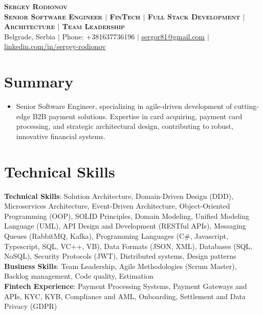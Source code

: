 \documentclass[letterpaper,11pt]{article}
\begin{document}
\begin{center}
    \textbf{\Huge \scshape Sergey Rodionov} \\
    \vspace{10pt} %
    \textbf{\LARGE \scshape Senior Software Engineer $|$ FinTech $|$ Full Stack Development $|$ Architecture $|$ Team Leadership } \\
    \vspace{10pt} %
    \small Belgrade, Serbia $|$ Phone: +381637736196 $|$ \href{mailto:sergor81@gmail.com}{\underline{sergor81@gmail.com}} $|$
    \href{https://www.linkedin.com/in/sergey-rodionov}{\underline{linkedin.com/in/sergey-rodionov}} \\
\end{center}

\section{Summary}
\begin{itemize}[leftmargin=0pt, label={}]
    \item \justifying Senior Software Engineer, specializing in agile-driven development of cutting-edge B2B payment solutions. Expertise in card acquiring, payment card processing, and strategic architectural design, contributing to robust, innovative financial systems.
\end{itemize}

\section{Technical Skills}
 \begin{itemize}[leftmargin=0pt, label={}]
    \small{
    \justifying %
        \item{
            \textbf{Technical Skills}{: Solution Architecture, Domain-Driven Design (DDD), Microservices Architecture, Event-Driven Architecture, Object-Oriented Programming (OOP), SOLID Principles, Domain Modeling, Unified Modeling Language (UML), API Design and Development (RESTful APIs), Messaging Queues (RabbitMQ, Kafka), Programming Languages (C\#, Javascript, Typescript, SQL, VC++, VB), Data Formats (JSON, XML), Databases (SQL, NoSQL), Security Protocols (JWT)}, Distributed systems, Design patterns \\
            \textbf{Business Skills}{: Team Leadership, Agile Methodologies (Scrum Master), Backlog management, Code quality, Estimation} \\
            \textbf{Fintech Experience}{: Payment Processing Systems, Payment Gateways and APIs, KYC, KYB, Compliance and AML, Onboarding, Settlement and Data Privacy (GDPR) }
        }
    }
 \end{itemize}
\end{document}
